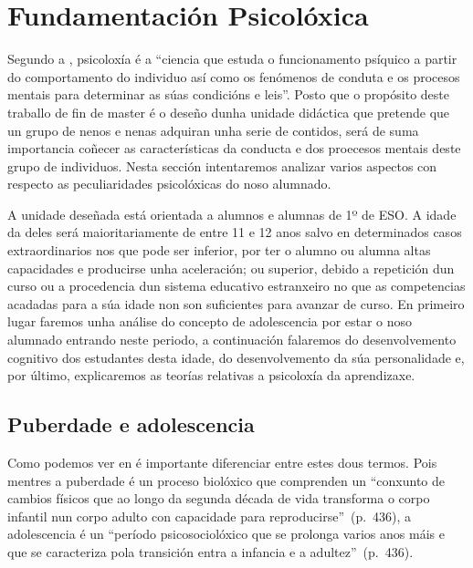 

\section{Fundamentación Psicolóxica}

Segundo a , psicoloxía é a ``ciencia que estuda o funcionamento psíquico a partir do comportamento do individuo así como os fenómenos de conduta e os procesos mentais para determinar as súas condicións e leis''. Posto que o propósito deste traballo de fin de master é o deseño dunha unidade didáctica que pretende que un grupo de nenos e nenas adquiran unha serie de contidos, será de suma importancia coñecer as características da conducta e dos proecesos mentais deste grupo de individuos. Nesta sección intentaremos analizar varios aspectos con respecto as peculiaridades psicolóxicas do noso alumnado.

A unidade deseñada está orientada a alumnos e alumnas de 1º de ESO. A idade da deles será maioritariamente de entre 11 e 12 anos salvo en determinados casos extraordinarios nos que pode ser inferior, por ter o alumno ou alumna altas capacidades e producirse unha aceleración; ou superior, debido a repetición dun curso ou a procedencia dun sistema educativo estranxeiro no que as competencias acadadas para a súa idade non son suficientes para avanzar de curso. En primeiro lugar faremos unha análise do concepto de adolescencia por estar o noso alumnado entrando neste periodo, a continuación falaremos do desenvolvemento cognitivo dos estudantes desta idade, do desenvolvemento da súa personalidade e, por último, explicaremos as teorías relativas a psicoloxía da aprendizaxe.

\subsection{Puberdade e adolescencia}
Como podemos ver en  é importante diferenciar entre estes dous termos. Pois mentres a puberdade é un proceso biolóxico que comprenden un ``conxunto de cambios físicos que ao longo da segunda década de vida transforma o corpo infantil nun corpo adulto con capacidade para reproducirse''~(p.~436), a adolescencia é un ``período psicosociolóxico que se prolonga varios anos máis e que se caracteriza pola transición entra a infancia e a adultez''~(p.~436).

